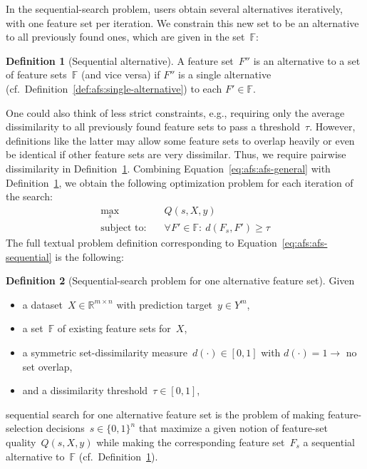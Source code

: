 \documentclass{article}
\theoremstyle{definition}
\newtheorem{definition}{Definition}
\begin{document}
In the sequential-search problem, users obtain several alternatives iteratively, with one feature set per iteration.
We constrain this new set to be an alternative to all previously found ones, which are given in the set~$\mathbb{F}$:
%
\begin{definition}[Sequential alternative]
	A feature set~$F''$ is an alternative to a set of feature sets~$\mathbb{F}$ (and vice versa) if $F''$ is a single alternative (cf.~Definition~\ref{def:afs:single-alternative}) to each $F' \in \mathbb{F}$.
	\label{def:afs:sequential-alternative}
\end{definition}
%
One could also think of less strict constraints, e.g., requiring only the average dissimilarity to all previously found feature sets to pass a threshold~$\tau$.
However, definitions like the latter may allow some feature sets to overlap heavily or even be identical if other feature sets are very dissimilar.
Thus, we require pairwise dissimilarity in Definition~\ref{def:afs:sequential-alternative}.
Combining Equation~\ref{eq:afs:afs-general} with Definition~\ref{def:afs:sequential-alternative}, we obtain the following optimization problem for each iteration of the search:
%
\begin{equation}
	\begin{aligned}
		\max_s &\quad Q(s,X,y) \\
		\text{subject to:} &\quad \forall F' \in \mathbb{F}:~d(F_s,F') \geq \tau
	\end{aligned}
	\label{eq:afs:afs-sequential}
\end{equation}
%
The full textual problem definition corresponding to Equation~\ref{eq:afs:afs-sequential} is the following:
%
\begin{definition}[Sequential-search problem for one alternative feature set]
	Given
	\begin{itemize}[noitemsep]
		\item a dataset~$X \in \mathbb{R}^{m \times n}$ with prediction target~$y \in Y^m$,
		\item a set~$\mathbb{F}$ of existing feature sets for~$X$,
		\item a symmetric set-dissimilarity measure~$d(\cdot) \in [0,1]$ with $d(\cdot) = 1 \rightarrow$ no set overlap,
		\item and a dissimilarity threshold~$\tau \in [0,1]$,
	\end{itemize}
	sequential search for one alternative feature set is the problem of making feature-selection decisions~$s \in \{0,1\}^n$ that maximize a given notion of feature-set quality~$Q(s,X,y)$ while making the corresponding feature set~$F_s$ a sequential alternative to~$\mathbb{F}$ (cf.~Definition~\ref{def:afs:sequential-alternative}).
	\label{def:afs:alternative-feature-selection-sequential}
\end{definition}
\end{document}
